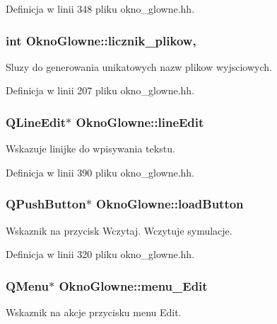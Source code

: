 Definicja w linii 348 pliku okno\-\_\-glowne.\-hh.

\hypertarget{class_okno_glowne_ae615cbd9c9f9ab06b365c4692ff68729}{
\subsubsection[{licznik\-\_\-plikow}]{\setlength{\rightskip}{0pt plus 5cm}int Okno\-Glowne\-::licznik\-\_\-plikow\hspace{0.3cm}{\ttfamily [static]}, {\ttfamily [private]}}}\label{class_okno_glowne_ae615cbd9c9f9ab06b365c4692ff68729}
Sluzy do generowania unikatowych nazw plikow wyjsciowych. 

Definicja w linii 207 pliku okno\-\_\-glowne.\-hh.

\hypertarget{class_okno_glowne_a0112b8be70a26552b03f38fab43a3301}{
\subsubsection[{line\-Edit}]{\setlength{\rightskip}{0pt plus 5cm}Q\-Line\-Edit$\ast$ Okno\-Glowne\-::line\-Edit\hspace{0.3cm}{\ttfamily [private]}}}\label{class_okno_glowne_a0112b8be70a26552b03f38fab43a3301}
Wskazuje linijke do wpisywania tekstu. 

Definicja w linii 390 pliku okno\-\_\-glowne.\-hh.

\hypertarget{class_okno_glowne_accbadc3bc4d418cfe1bce2be61881917}{
\subsubsection[{load\-Button}]{\setlength{\rightskip}{0pt plus 5cm}Q\-Push\-Button$\ast$ Okno\-Glowne\-::load\-Button\hspace{0.3cm}{\ttfamily [private]}}}\label{class_okno_glowne_accbadc3bc4d418cfe1bce2be61881917}
Wskaznik na przycisk Wczytaj. Wczytuje symulacje. 

Definicja w linii 320 pliku okno\-\_\-glowne.\-hh.

\hypertarget{class_okno_glowne_a93afadd0ec22ce6a7e29acc5dd2423a2}{
\subsubsection[{menu\-\_\-\-Edit}]{\setlength{\rightskip}{0pt plus 5cm}Q\-Menu$\ast$ Okno\-Glowne\-::menu\-\_\-\-Edit\hspace{0.3cm}{\ttfamily [private]}}}\label{class_okno_glowne_a93afadd0ec22ce6a7e29acc5dd2423a2}
Wskaznik na akcje przycisku menu Edit. 

